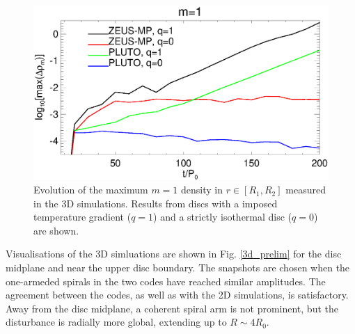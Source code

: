 
\begin{figure}
  \includegraphics[width=\linewidth]{figures/m1_analysis_plot_ampmax3d.ps}
  \caption{Evolution of the maximum $m=1$ density in  $r\in[R_1,R_2]$
    measured in the 3D simulations. Results from discs with a imposed 
    temperature gradient ($q=1$) and a strictly isothermal disc
    ($q=0$) are shown.  
    \label{3d_ampmax}}   
\end{figure}

Visualisations of the 3D simluations are shown in   
Fig. \ref{3d_prelim} for the disc midplane and near the upper disc
boundary. The snapshots are chosen when the one-armeded spirals in the two codes
have reached similar amplitudes. The agreement between the codes,
as well as with the 2D simulations, is satisfactory. Away from the
disc midplane, a coherent spiral arm is not prominent, but the
disturbance is radially more global, extending up to $R\sim 4R_0$.   

